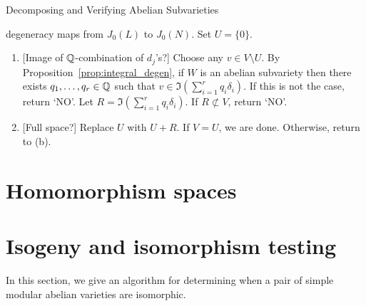 \documentclass[11pt, proquest]{uwthesis}
\begin{document}
\begin{algorithm}{Decomposing and Verifying Abelian Subvarieties}
\begin{enumerate}
            degeneracy maps from $J_0(L)$ to $J_0(N)$.  Set $U=\{0\}$.
            \begin{enumerate}
                \item{} [Image of $\mathbb{Q}$-combination of $d_j$'s?]
                    Choose any $v\in V\setminus U$. By
                    Proposition~\ref{prop:integral_degen}, if $W$ is an abelian
                    subvariety then there exists $q_1,\ldots,q_r\in \mathbb{Q}$
                    such that $v\in \Im \left(\sum_{i=1} ^r q_i
                    \delta_i\right)$. If this is not the case, return
                    `NO'. Let $R = \Im \left(\sum_{i=1} ^r q_i
                    \delta_i\right)$. If $R\not\subset V$, return `NO'.
                \item{} [Full space?]
                    Replace $U$ with $U+R$. If $V=U$, we are done. Otherwise,
                    return to (b).
            \end{enumerate}
    \end{enumerate}
\end{algorithm}


\section{Homomorphism spaces}


\section{Isogeny and isomorphism testing}

In this section, we give an algorithm for determining when a pair of simple
modular abelian varieties are isomorphic.
\end{document}
